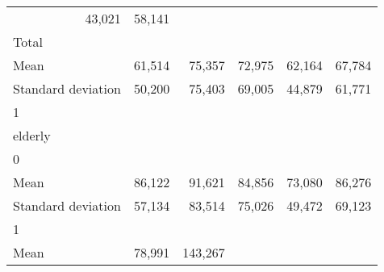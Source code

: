 \begin{tabular}{llllll}
  \multicolumn{1}{r}{43,021} &
  \multicolumn{1}{r}{58,141} \\
\multicolumn{1}{l}{\hspace{3em}Total} &
  \multicolumn{1}{|r}{} &
  \multicolumn{1}{r}{} &
  \multicolumn{1}{r}{} &
  \multicolumn{1}{r}{} &
  \multicolumn{1}{r}{} \\
\multicolumn{1}{l}{\hspace{4em}Mean} &
  \multicolumn{1}{|r}{61,514} &
  \multicolumn{1}{r}{75,357} &
  \multicolumn{1}{r}{72,975} &
  \multicolumn{1}{r}{62,164} &
  \multicolumn{1}{r}{67,784} \\
\multicolumn{1}{l}{\hspace{4em}Standard deviation} &
  \multicolumn{1}{|r}{50,200} &
  \multicolumn{1}{r}{75,403} &
  \multicolumn{1}{r}{69,005} &
  \multicolumn{1}{r}{44,879} &
  \multicolumn{1}{r}{61,771} \\
\multicolumn{1}{l}{\hspace{1em}1} &
  \multicolumn{1}{|r}{} &
  \multicolumn{1}{r}{} &
  \multicolumn{1}{r}{} &
  \multicolumn{1}{r}{} &
  \multicolumn{1}{r}{} \\
\multicolumn{1}{l}{\hspace{2em}elderly} &
  \multicolumn{1}{|r}{} &
  \multicolumn{1}{r}{} &
  \multicolumn{1}{r}{} &
  \multicolumn{1}{r}{} &
  \multicolumn{1}{r}{} \\
\multicolumn{1}{l}{\hspace{3em}0} &
  \multicolumn{1}{|r}{} &
  \multicolumn{1}{r}{} &
  \multicolumn{1}{r}{} &
  \multicolumn{1}{r}{} &
  \multicolumn{1}{r}{} \\
\multicolumn{1}{l}{\hspace{4em}Mean} &
  \multicolumn{1}{|r}{86,122} &
  \multicolumn{1}{r}{91,621} &
  \multicolumn{1}{r}{84,856} &
  \multicolumn{1}{r}{73,080} &
  \multicolumn{1}{r}{86,276} \\
\multicolumn{1}{l}{\hspace{4em}Standard deviation} &
  \multicolumn{1}{|r}{57,134} &
  \multicolumn{1}{r}{83,514} &
  \multicolumn{1}{r}{75,026} &
  \multicolumn{1}{r}{49,472} &
  \multicolumn{1}{r}{69,123} \\
\multicolumn{1}{l}{\hspace{3em}1} &
  \multicolumn{1}{|r}{} &
  \multicolumn{1}{r}{} &
  \multicolumn{1}{r}{} &
  \multicolumn{1}{r}{} &
  \multicolumn{1}{r}{} \\
\multicolumn{1}{l}{\hspace{4em}Mean} &
  \multicolumn{1}{|r}{78,991} &
  \multicolumn{1}{r}{143,267} &

\end{tabular}
